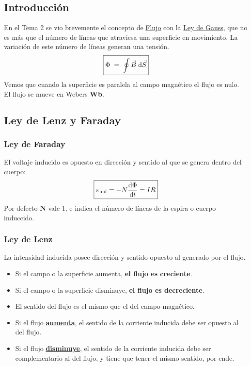 \subsection{Introducción}
 En el Tema 2 se vio brevemente el concepto de \underline{Flujo} con la \underline{Ley de Gauss}, que no es más que el número de líneas que atraviesa una superficie en movimiento. La variación de este número de líneas generan una tensión.
\[
        \boxed{\Phi \hspace{1mm}=\hspace{1mm} \oint \vec{B}\hspace{1mm}\mathrm{d}\vec{S}}
\]
 Vemos que cuando la superficie es paralela al campo magnético el flujo es nulo.\\
 El flujo se mueve en Webers \textbf{Wb}.
\subsection{Ley de Lenz y Faraday}
\subsubsection{Ley de Faraday}
 El voltaje inducido es opuesto en dirección y sentido al que se genera dentro del cuerpo:
\[
        \boxed{\mathbf{\varepsilon_{\textnormal{ind}}} = -N\frac{\mathrm{d}\Phi}{\mathrm{d}t} = IR}
\]
 Por defecto \(\mathbf{N}\) vale 1, e indica el número de líneas de la espira o cuerpo induccido.
\subsubsection{Ley de Lenz}
La intensidad inducida posee dirección y sentido opuesto al generado por el flujo.
\begin{itemize}
        \item Si el campo o la superficie aumenta, \textbf{el flujo es creciente}.
        \item Si el campo o la superficie disminuye, \textbf{el flujo es decreciente}.
        \item El sentido del flujo es el mismo que el del campo magnético.
        \item Si el flujo \underline{\textbf{aumenta}}, el sentido de la corriente inducida debe ser opuesto al del flujo.
        \item Si el flujo \underline{\textbf{disminuye}}, el sentido de la corriente inducida debe ser complementario al del flujo, y tiene que tener el mismo sentido, por ende.
\end{itemize}
